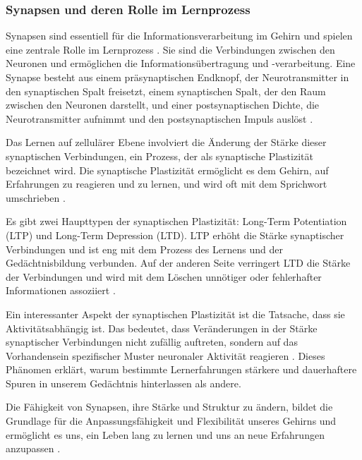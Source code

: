 \subsubsection{Synapsen und deren Rolle im Lernprozess}
Synapsen sind essentiell für die Informationsverarbeitung im Gehirn und spielen eine zentrale Rolle im Lernprozess \cite{Kandel2012}. Sie sind die Verbindungen zwischen den Neuronen und ermöglichen die Informationsübertragung und -verarbeitung. Eine Synapse besteht aus einem präsynaptischen Endknopf, der Neurotransmitter in den synaptischen Spalt freisetzt, einem synaptischen Spalt, der den Raum zwischen den Neuronen darstellt, und einer postsynaptischen Dichte, die Neurotransmitter aufnimmt und den postsynaptischen Impuls auslöst \cite{Bear2015}.\newline

\noindent
Das Lernen auf zellulärer Ebene involviert die Änderung der Stärke dieser synaptischen Verbindungen, ein Prozess, der als synaptische Plastizität bezeichnet wird. Die synaptische Plastizität ermöglicht es dem Gehirn, auf Erfahrungen zu reagieren und zu lernen, und wird oft mit dem Sprichwort  umschrieben \cite{Hebb1949}. \newline

\noindent
Es gibt zwei Haupttypen der synaptischen Plastizität: Long-Term Potentiation (LTP) und Long-Term Depression (LTD). LTP erhöht die Stärke synaptischer Verbindungen und ist eng mit dem Prozess des Lernens und der Gedächtnisbildung verbunden. Auf der anderen Seite verringert LTD die Stärke der Verbindungen und wird mit dem Löschen unnötiger oder fehlerhafter Informationen assoziiert \cite{Cooke2006}. \newline

\noindent
Ein interessanter Aspekt der synaptischen Plastizität ist die Tatsache, dass sie Aktivitätsabhängig ist. Das bedeutet, dass Veränderungen in der Stärke synaptischer Verbindungen nicht zufällig auftreten, sondern auf das Vorhandensein spezifischer Muster neuronaler Aktivität reagieren \cite{Kandel2012}. Dieses Phänomen erklärt, warum bestimmte Lernerfahrungen stärkere und dauerhaftere Spuren in unserem Gedächtnis hinterlassen als andere. \newline

\noindent
Die Fähigkeit von Synapsen, ihre Stärke und Struktur zu ändern, bildet die Grundlage für die Anpassungsfähigkeit und Flexibilität unseres Gehirns und ermöglicht es uns, ein Leben lang zu lernen und uns an neue Erfahrungen anzupassen \cite{Bear2015}. \newline

